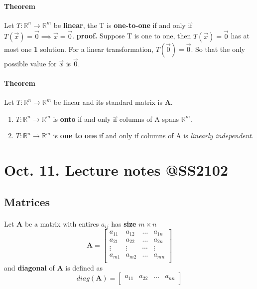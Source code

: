 \documentclass{article}
\begin{document}
	\paragraph{Theorem} Let $T:\mathbb{R}^n \rightarrow \mathbb{R}^m$ be \textbf{linear}, the T is \textbf{one-to-one} if and only if $T(\vec{x}) = \vec{0} \implies \vec{x} = \vec{0}$.
	\newline \quad
	\newline \textbf{proof.}
	\newline Suppose T is one to one, then $T(\vec{x}) = \vec{0}$ has at most one \textbf{1} solution. For a linear transformation, $T(\vec{0}) = \vec{0}$. So that the only possible value for $\vec{x}$ is $\vec{0}$.
	\paragraph{Theorem} Let $T:\mathbb{R}^n \rightarrow \mathbb{R}^m$ be linear and its standard matrix is \textbf{A}.
	\begin{enumerate}
		\item $T:\mathbb{R}^n \rightarrow \mathbb{R}^m$ is \textbf{onto} if and only if columns of A spans $\mathbb{R}^m$.
		\item $T:\mathbb{R}^n \rightarrow \mathbb{R}^m$ is \textbf{one to one} if and only if columns of A is \emph{linearly independent}.
	\end{enumerate}
	\section{Oct. 11. Lecture notes @SS2102}
	\subsection{Matrices}
	\paragraph{} Let \textbf{A} be a matrix with entires $a_{ij}$ has \textbf{size} $m \times n$
	\[
	\textbf{A} = 
	\begin{bmatrix}
		a_{11} & a_{12} & \dots & a_{1n} \\
		a_{21} & a_{22} & \dots & a_{2n} \\
		\vdots & \vdots & \cdots & \vdots \\
		a_{m1} & a_{m2} & \dots & a_{mn} \\
	\end{bmatrix}
	\] and \textbf{diagonal} of \textbf{A} is defined as
	\[
	diag(\textbf{A}) = \begin{bmatrix}
		a_{11} & a_{22} & \dots & a_{nn} \\
	\end{bmatrix}
	\]
\end{document}
